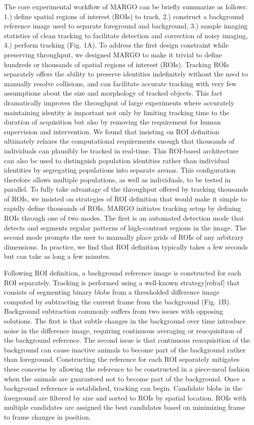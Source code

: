 \documentclass[10pt]{article}
\begin{document}
\begin{multicols}{2}
The core experimental workflow of MARGO can be briefly summarize as follows: 1.) define spatial regions of interest (ROIs) to track, 2.) construct a background reference image used to separate foreground and background, 3.) sample imaging statistics of clean tracking to facilitate detection and correction of noisy imaging, 4.) perform tracking (Fig. 1A). To address the first design constraint while preserving throughput, we designed MARGO to make it trivial to define hundreds or thousands of spatial regions of interest (ROIs). Tracking ROIs separately offers the ability to preserve identities indefinitely without the need to manually resolve collisions, and can facilitate accurate tracking with very few assumptions about the size and morphology of tracked objects. This fact dramatically improves the throughput of large experiments where accurately maintaining identity is important not only by limiting tracking time to the duration of acquisition but also by removing the requirement for human supervision and intervention. We found that insisting on ROI definition ultimately relaxes the computational requirements enough that thousands of individuals can plausibly be tracked in real-time. This ROI-based architecture can also be used to distinguish population identities rather than individual identities by segregating populations into separate arenas. This configuration therefore allows multiple populations, as well as individuals, to be tested in parallel. To fully take advantage of the throughput offered by tracking thousands of ROIs, we insisted on strategies of ROI definition that would make it simple to rapidly define thousands of ROIs. MARGO initiates tracking setup by defining ROIs through one of two modes. The first is an automated detection mode that detects and segments regular patterns of high-contrast regions in the image. The second mode prompts the user to manually place grids of ROIs of any arbitrary dimensions. In practice, we find that ROI definition typically takes a few seconds but can take as long a few minutes.

Following ROI definition, a background reference image is constructed for each ROI separately. Tracking is performed using a well-known strategy[refraf] that consists of segmenting binary blobs from a thresholded difference image computed by subtracting the current frame from the background (Fig. 1B). Background subtraction commonly suffers from two issues with opposing solutions. The first is that subtle changes in the background over time introduce noise in the difference image, requiring continuous averaging or reacquisition of the background reference. The second issue is that continuous reacquisition of the background can cause inactive animals to become part of the background rather than foreground. Constructing the reference for each ROI separately mitigates these concerns by allowing the reference to be constructed in a piece-meal fashion when the animals are guaranteed not to become part of the background. Once a background reference is established, tracking can begin. Candidate blobs in the foreground are filtered by size and sorted to ROIs by spatial location. ROIs with multiple candidates are assigned the best candidates based on minimizing frame to frame changes in position.


\end{multicols}
\end{document}
